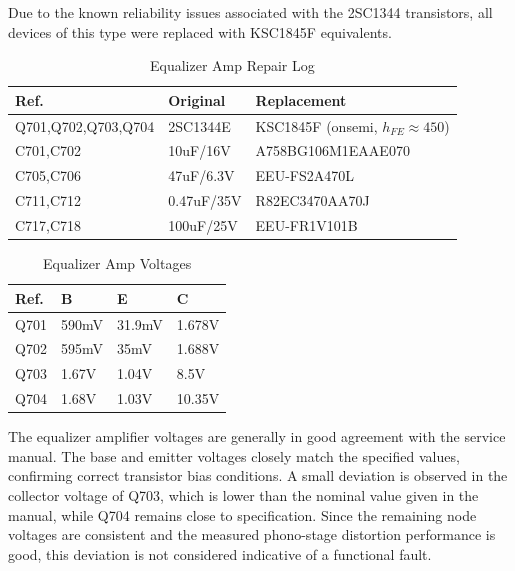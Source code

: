 \documentclass[]{article}
\begin{document}
Due to the known reliability issues associated with the 2SC1344 transistors, all devices of this type were replaced with KSC1845F equivalents.

\begin{table}[H]
	\centering
	\caption{Equalizer Amp Repair Log}
	\label{tab:eq_amp_log}
	\begin{tabular}{|l|l|l|}
		\hline
		\textbf{Ref.} & \textbf{Original} & \textbf{Replacement} \\
		\hline
		Q701,Q702,Q703,Q704 & 2SC1344E & KSC1845F (onsemi, $h_{FE} \approx 450$) \\
        \hline
        C701,C702 & 10uF/16V & A758BG106M1EAAE070 \\
        \hline
        C705,C706 & 47uF/6.3V & EEU-FS2A470L \\
        \hline
        C711,C712 & 0.47uF/35V & R82EC3470AA70J \\
        \hline
        C717,C718 & 100uF/25V & EEU-FR1V101B \\
        \hline
	\end{tabular}
\end{table}


\begin{table}[H]
	\centering
	\caption{Equalizer Amp Voltages}
	\label{tab:eq_amp_voltages}
	\begin{tabular}{|l|l|l|l|}
    \hline
 \textbf{Ref.} & \textbf{B} & \textbf{E} & \textbf{C} \\
    \hline
    Q701 & 590mV  & 31.9mV  & 1.678V   \\
    \hline
    Q702 & 595mV   & 35mV  & 1.688V  \\
    \hline
    Q703 & 1.67V  &  1.04V  & 8.5V  \\
    \hline
    Q704 & 1.68V  & 1.03V  & 10.35V   \\
    \hline
	\end{tabular}
\end{table}

The equalizer amplifier voltages are generally in good agreement with the service manual. The base and emitter voltages closely match the specified values, confirming correct transistor bias conditions. A small deviation is observed in the collector voltage of Q703, which is lower than the nominal value given in the manual, while Q704 remains close to specification. Since the remaining node voltages are consistent and the measured phono-stage distortion performance is good, this deviation is not considered indicative of a functional fault.
\end{document}
